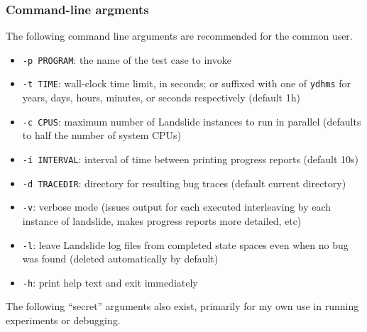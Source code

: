 
\subsubsection{Command-line argments}

The following command line arguments are recommended for the common user.

\begin{itemize}
	\item {\tt -p PROGRAM}: the name of the test case to invoke
	\item {\tt -t TIME}: wall-clock time limit, in seconds; or suffixed with one of {\tt ydhms} for years, days, hours, minutes, or seconds respectively (default 1h)
	\item {\tt -c CPUS}: maximum number of Landslide instances to run in parallel (defaults to half the number of system CPUs)
	\item {\tt -i INTERVAL}: interval of time between printing progress reports (default 10s)
	\item {\tt -d TRACEDIR}: directory for resulting bug traces (default current directory)
	\item {\tt -v}: verbose mode (issues output for each executed interleaving by each instance of landslide, makes progress reports more detailed, etc)
	\item {\tt -l}: leave Landslide log files from completed state spaces even when no bug was found (deleted automatically by default)
	\item {\tt -h}: print help text and exit immediately
\end{itemize}

The following ``secret'' arguments also exist, primarily for my own use in running experiments or debugging.

